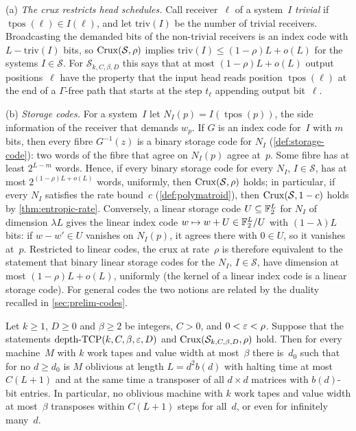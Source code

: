 \begin{remark}\label{rem:dec-crux}
(a) \emph{The crux restricts head schedules.} Call receiver~$\ell$ of a system~$I$ \emph{trivial} if
$\operatorname{tpos}(\ell)\in I(\ell)$, and let $\mathrm{triv}(I)$ be the number of trivial receivers. Broadcasting
the demanded bits of the non-trivial receivers is an index code with $L-\mathrm{triv}(I)$ bits, so
$\mathrm{Crux}(\mathcal S,\rho)$ implies $\mathrm{triv}(I)\le(1-\rho)L+o(L)$ for the systems $I\in\mathcal S$. For
$\mathcal S_{k,C,\beta,D}$ this says that at most $(1-\rho)L+o(L)$ output positions~$\ell$ have the property that the input
head reads position $\operatorname{tpos}(\ell)$ at the end of a $\Gamma$-free path that starts at the step $t_\ell$ appending
output bit~$\ell$.

(b) \emph{Storage codes.} For a system~$I$ let $N_I(p)=I(\operatorname{tpos}(p))$, the side information
of the receiver that demands $w_p$. If $G$ is an index code for~$I$ with $m$ bits, then every fibre $G^{-1}(z)$
is a binary storage code for $N_I$ (\cref{def:storage-code}): two words of the fibre that agree on $N_I(p)$
agree at~$p$. Some fibre has at least $2^{L-m}$ words. Hence, if every binary storage code for every $N_I$,
$I\in\mathcal S$, has at most $2^{(1-\rho)L+o(L)}$ words, uniformly, then $\mathrm{Crux}(\mathcal S,\rho)$ holds; in
particular, if every $N_I$ satisfies the rate bound~$c$ (\cref{def:polymatroid}), then $\mathrm{Crux}(\mathcal S,1-c)$ holds
by \cref{thm:entropic-rate}. Conversely, a linear storage code $U\subseteq\mathbb{F}_2^L$ for $N_I$ of dimension $\lambda L$
gives the linear index code $w\mapsto w+U\in\mathbb{F}_2^L/U$ with $(1-\lambda)L$ bits: if $w-w'\in U$ vanishes on
$N_I(p)$, it agrees there with $0\in U$, so it vanishes at~$p$. Restricted to linear codes, the crux at
rate~$\rho$ is therefore equivalent to the statement that binary linear storage codes for the $N_I$, $I\in\mathcal S$,
have dimension at most $(1-\rho)L+o(L)$, uniformly (the kernel of a linear index code is a linear storage code). For
general codes the two notions are related by the duality recalled in \cref{sec:prelim-codes}.
\end{remark}

\begin{theorem}\label{thm:D}
\notformalized
Let $k\ge1$, $D\ge0$ and $\beta\ge2$ be integers, $C>0$, and $0<\varepsilon<\rho$. Suppose that the statements
$\mathrm{depth}\text{-}\mathrm{TCP}(k,C,\beta,\varepsilon,D)$ and $\mathrm{Crux}(\mathcal S_{k,C,\beta,D},\rho)$ hold. Then for every
machine~$M$ with $k$ work tapes and value width at most~$\beta$ there is~$d_0$ such that for no $d\ge d_0$ is $M$
oblivious at length $L=d^2b(d)$ with halting time at most $C(L+1)$ and at the same time a transposer of all
$d\times d$ matrices with $b(d)$-bit entries. In particular, no oblivious machine with $k$ work tapes and value width
at most~$\beta$ transposes within $C(L+1)$ steps for all~$d$, or even for infinitely many~$d$.
\end{theorem}

